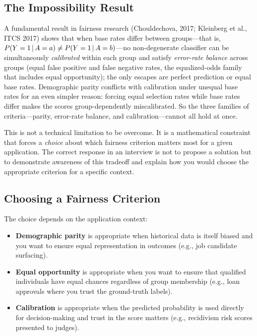 \subsection{The Impossibility Result}

A fundamental result in fairness research (Chouldechova, 2017; Kleinberg et al.,
ITCS 2017) shows that when base rates differ between groups---that is,
$P(Y=1 \,|\, A=a) \neq P(Y=1 \,|\, A=b)$---no non-degenerate classifier can
be simultaneously \emph{calibrated} within each group and satisfy
\emph{error-rate balance} across groups (equal false positive and false
negative rates, the equalized-odds family that includes equal opportunity);
the only escapes are perfect prediction or equal base rates.  Demographic
parity conflicts with calibration under unequal base rates for an even
simpler reason: forcing equal selection rates while base rates differ makes
the scores group-dependently miscalibrated.  So the three families of
criteria---parity, error-rate balance, and calibration---cannot all hold at
once.

This is not a technical limitation to be overcome.  It is a mathematical
constraint that forces a \emph{choice} about which fairness criterion matters
most for a given application.  The correct response in an interview is not to
propose a solution but to demonstrate awareness of this tradeoff and explain
how you would choose the appropriate criterion for a specific context.

\subsection{Choosing a Fairness Criterion}

The choice depends on the application context:

\begin{itemize}
    \item \textbf{Demographic parity} is appropriate when historical data is
    itself biased and you want to ensure equal representation in outcomes
    (e.g., job candidate surfacing).
    \item \textbf{Equal opportunity} is appropriate when you want to ensure
    that qualified individuals have equal chances regardless of group
    membership (e.g., loan approvals where you trust the ground-truth labels).
    \item \textbf{Calibration} is appropriate when the predicted probability
    is used directly for decision-making and trust in the score matters
    (e.g., recidivism risk scores presented to judges).
\end{itemize}

